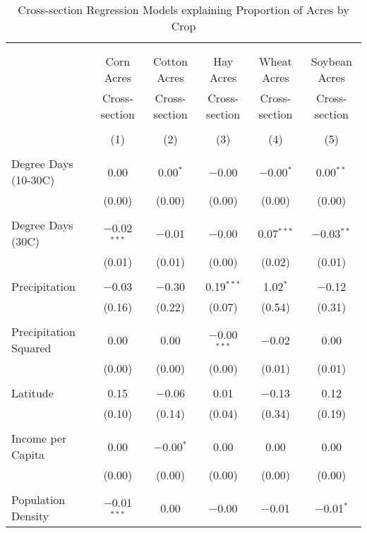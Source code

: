 \documentclass[10pt]{article}
\begin{document}
\newpage
\begin{table}[!htbp] \centering 
  \caption{Cross-section Regression Models explaining Proportion of Acres by Crop} 
  \label{} 
\footnotesize 
\begin{tabular}{@{\extracolsep{5pt}}lccccc} 
\\[-1.8ex]\hline 
\hline \\[-1.8ex] 
\\[-1.8ex] & Corn Acres & Cotton Acres & Hay Acres & Wheat Acres & Soybean Acres \\ 
 & Cross-section & Cross-section & Cross-section & Cross-section & Cross-section \\ 
\\[-1.8ex] & (1) & (2) & (3) & (4) & (5)\\ 
\hline \\[-1.8ex] 
 Degree Days (10-30C) & 0.00 & 0.00$^{*}$ & $-$0.00 & $-$0.00$^{*}$ & 0.00$^{**}$ \\ 
  & (0.00) & (0.00) & (0.00) & (0.00) & (0.00) \\ 
  & & & & & \\ 
 Degree Days (30C) & $-$0.02$^{***}$ & $-$0.01 & $-$0.00 & 0.07$^{***}$ & $-$0.03$^{**}$ \\ 
  & (0.01) & (0.01) & (0.00) & (0.02) & (0.01) \\ 
  & & & & & \\ 
 Precipitation & $-$0.03 & $-$0.30 & 0.19$^{***}$ & 1.02$^{*}$ & $-$0.12 \\ 
  & (0.16) & (0.22) & (0.07) & (0.54) & (0.31) \\ 
  & & & & & \\ 
 Precipitation Squared & 0.00 & 0.00 & $-$0.00$^{***}$ & $-$0.02 & 0.00 \\ 
  & (0.00) & (0.00) & (0.00) & (0.01) & (0.01) \\ 
  & & & & & \\ 
 Latitude & 0.15 & $-$0.06 & 0.01 & $-$0.13 & 0.12 \\ 
  & (0.10) & (0.14) & (0.04) & (0.34) & (0.19) \\ 
  & & & & & \\ 
 Income per Capita & 0.00 & $-$0.00$^{*}$ & 0.00 & 0.00 & 0.00 \\ 
  & (0.00) & (0.00) & (0.00) & (0.00) & (0.00) \\ 
  & & & & & \\ 
 Population Density & $-$0.01$^{***}$ & 0.00 & $-$0.00 & $-$0.01 & $-$0.01$^{*}$ \\ 

\end{tabular}
\end{table}
\end{document}
